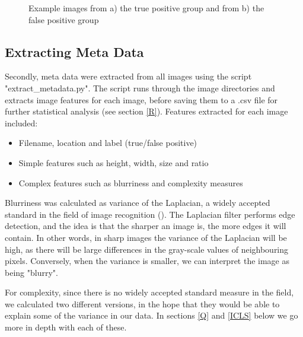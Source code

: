 \documentclass[12pt]{article}
\begin{document}
\begin{figure}[ht]
	\begin{center}
		\hfill
		\caption{Example images from a) the true positive group and from b) the false positive group} 
		\label{fig:groupex}
	\end{center}
\end{figure}

\subsection{Extracting Meta Data}
Secondly, meta data were extracted from all images using the script "extract\_metadata.py". The script runs through the image directories and extracts image features for each image, before saving them to a .csv file for further statistical  analysis (see section \ref{R}).
Features extracted for each image included:

\begin{itemize}
	\item Filename, location and label (true/false positive)
	\item Simple features such as height, width, size and ratio
	\item Complex features such as blurriness and complexity measures
\end{itemize}

Blurriness was calculated as variance of the Laplacian, a widely accepted standard in the field of image recognition (\cite{bansalBlurImageDetection2016}). The Laplacian filter performs edge detection, and the idea is that the sharper an image is, the more edges it will contain. In other words, in sharp images the variance of the Laplacian will be high, as there will be large differences in the gray-scale values of neighbouring pixels. Conversely, when the variance is smaller, we can interpret the image as being "blurry".

For complexity, since there is no widely accepted standard measure in the field, we calculated two different versions, in the hope that they would be able to explain some of the variance in our data. In sections \ref{Q} and \ref{ICLS} below we go more in depth with each of these.
\end{document}
